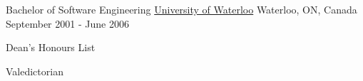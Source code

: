 

\begin{cventries}

  \cventry
    {Bachelor of Software Engineering} %
    {\href{https://uwaterloo.ca/}{University of Waterloo}} %
    {Waterloo, ON, Canada} %
    {September 2001 - June 2006} %
    {
      \begin{cvitems} %
        \item {Dean's Honours List}
        \item {Valedictorian}
      \end{cvitems}
    }

\end{cventries}
